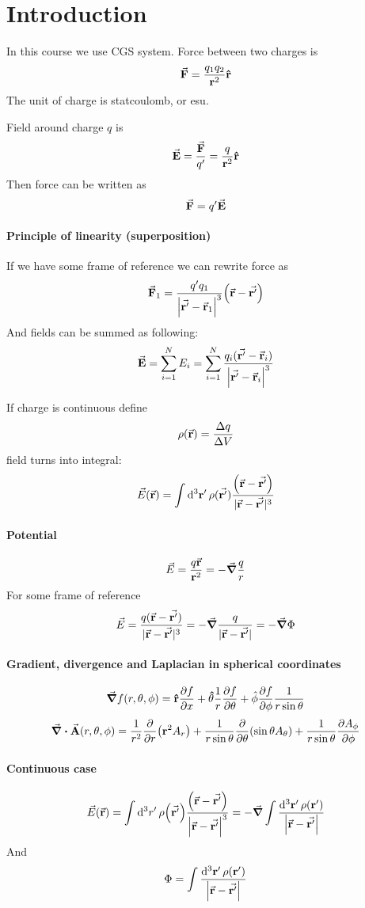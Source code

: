 \section{Introduction}
In this course we use CGS system. Force between two charges is
$$\va{F} = \frac{q_1q_2}{\vb{r}^2}\vu{r}$$
The unit of charge is statcoulomb, or esu.

Field around charge $q$ is
$$\va{E} = \frac{\va{F}}{q'}= \frac{q}{\vb{r}^2}\vu{r}$$
Then force can be written as $$\va{F} = q' \va{E}$$

\paragraph{Principle of linearity (superposition)}
If we have some frame of reference we can rewrite force as
$$\va{F}_1 = \frac{q'q_1}{\abs{\va{r'}-\va{r}_1}^3}\qty(\va{r}-\va{r'})$$
And fields can be summed as following:
$$\va{E} = \sum_{i=1}^N E_i = \sum_{i=1}^N \frac{q_i(\va{r'}-\va{r}_i)}{\abs{\va{r'}-\va{r}_i}^3}$$

If charge is continuous define
$$\rho(\va{r}) = \frac{\Delta q}{\Delta V}$$
field turns into integral:
$$\vec{E}(\va{r}) = \int \dd[3]{\vb{r'}}  \rho(\va{r'}) \frac{\qty(\va{r}-\va{r'})}{|\va{r}-\va{r'}|^3}$$
\paragraph{Potential}
$$\vec{E} = \frac{q\va{r}}{\vb{r}^2} = -\grad{\frac{q}{r}} $$
For some frame of reference
$$\vec{E} = \frac{q(\va{r}-\va{r'})}{|\va{r}-\va{r'}|^3} = -\grad\frac{q}{|\va{r}-\va{r'}|} = -\grad \Phi$$
\paragraph{Gradient, divergence and Laplacian in spherical coordinates}
$$\grad{f(r, \theta, \phi) } = \vu{r} \pdv{f}{x} + \vu{\theta} \frac{1}{r} \pdv{f}{\theta} + \hat{\phi} \pdv{f}{\phi} \frac{1}{r \sin \theta}$$
$$\div{\va{A} (r,\theta, \phi) } = \frac{1}{r^2} \pdv{r} (\vb{r}^2 A_r) + \frac{1}{r\sin \theta}\pdv{\theta}  (\sin \theta A_\theta) + \frac{1}{r \sin \theta} \pdv{ A_\phi}{\phi}$$
\paragraph{Continuous case}

$$\vec{E}\qty(\va{r}) = \int \dd[3]{r'} \rho\qty(\va{r'}) \frac{\qty(\va{r}-\va{r'})}{\abs{\va{r}-\va{r'}}^3} = -\grad \int \frac{\dd[3]{\vb{r'}} \rho(\vb{r'})}{\abs{\va{r}-\va{r'}}} $$
And
$$\Phi = \int \frac{\dd[3]{\vb{r'}} \rho\qty(\vb{r'})}{\abs{\va{r}-\va{r'}}}$$
